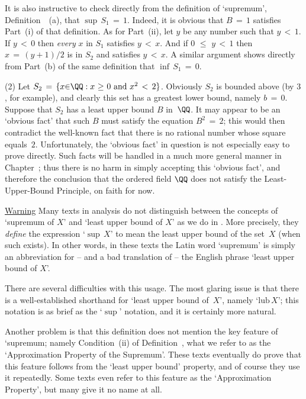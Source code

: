         It is also instructive to check directly from the definition of `supremum', Definition~~(a), that ${\sup}\,S_{1} \,=\, 1$.
    Indeed, it is obvious that $B \,=\, 1$ satisfies Part~(i) of that definition.
    As for Part~(ii), let $y$ be any number such that $y\,<\,1$. If $y\,<\,0$ then {\em every} $x$ in $S_{1}$ satisfies $y\,<\,x$.
    And if $0\,\,{\leq}\,\,y\,<\,1$ then $x \,=\, (y+1)/2$ is in $S_{2}$ and satisfies $y\,<\,x$.
    A similar argument shows directly from Part~(b) of the same definition that  ${\inf}\,S_{1} \,=\, 0$.

\V

        (2) Let $S_{2} \,=\, \{x{\in}{\QQ}: x\,\,{\geq}\,\,0 \mbox{ and } x^{2}\,<\,2\}$.
    Obviously $S_{2}$ is bounded above (by $3$, for example), and clearly this set has a greatest lower bound, namely $b \,=\, 0$.
    Suppose that $S_{2}$ has a least upper bound $B$ in~${\QQ}$. It may appear to be an `obvious fact' that such $B$ must satisfy the equation $B^{2} \,=\, 2$;
    this would then contradict the well-known fact that there is no rational number whose square equals~$2$.
    Unfortunately, the `obvious fact' in question is not especially easy to prove directly.
    Such facts will be handled in a much more general manner in Chapter~;
    thus there is no harm in simply accepting this `obvious fact', and therefore the conclusion that
    the ordered field ${\QQ}$ does not satisfy the Least-Upper-Bound Principle, on faith for now.


\VV

        \underline{Warning}
    Many texts in analysis do not distinguish between the concepts of `supremum of $X$' and `least upper bound of $X$' as we do in {\ThisText}.
    More precisely, they {\em define} the expression `${\sup}\,X$' to mean the least upper bound of the set~$X$ (when such exists). In other words,
    in these texts the Latin word `supremum' is simply an abbreviation for -- and a bad translation of -- the English phrase `least upper bound of $X$'.

        There are several difficulties with this usage. The most glaring issue is that there is 
    a well-established shorthand for `least upper bound of~$X$', namely `$\mbox{lub}\,X$';
    this notation is as brief as the `${\sup}$' notation, and it is certainly more natural.

        Another problem is that this definition does not mention the key feature of `supremum; namely Condition~(ii) of Definition~,
    what we refer to as the `Approximation Property of the Supremum'. These texts eventually
    do prove that this feature follows from the `least upper bound' property, and of course they use it repeatedly.
    Some texts even refer to this feature as the `Approximation Property', but many give it no name at all.

